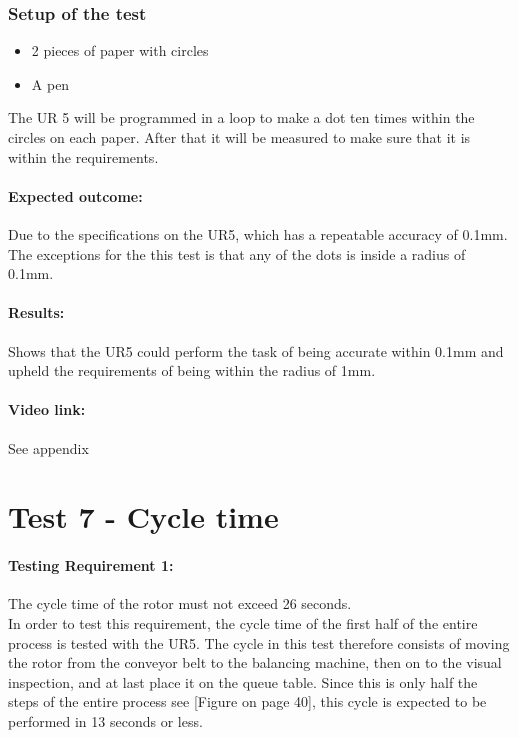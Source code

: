 \subsubsection{Setup of the test}

\begin{itemize}
 \item 2 pieces of paper with circles 
 \item A pen 
\end{itemize}

The UR 5 will be programmed in a loop to make a dot ten times within the circles on each paper. After that it will be measured to make sure that it is within the requirements.

\paragraph{Expected outcome:}
Due to the specifications on the UR5, which has a repeatable accuracy of 0.1mm. The exceptions for the this test is that any of the dots is inside a radius of 0.1mm.

\paragraph{Results: }
Shows that the UR5 could perform the task of being accurate within 0.1mm and upheld the requirements of being within the radius of 1mm. 

\paragraph{Video link: }
See appendix \cite{testfilm}

\section{Test 7 - Cycle time}

\paragraph{Testing Requirement 1:} The cycle time of the rotor must not exceed 26 seconds.\\
In order to test this requirement, the cycle time of the first half of the entire process is tested with the UR5. The cycle in this test therefore consists of moving the rotor from the conveyor belt to the balancing machine, then on to the visual inspection, and at last place it on the queue table. Since this is only half the steps of the entire process see [Figure on page 40], this cycle is expected to be performed in 13 seconds or less. 

